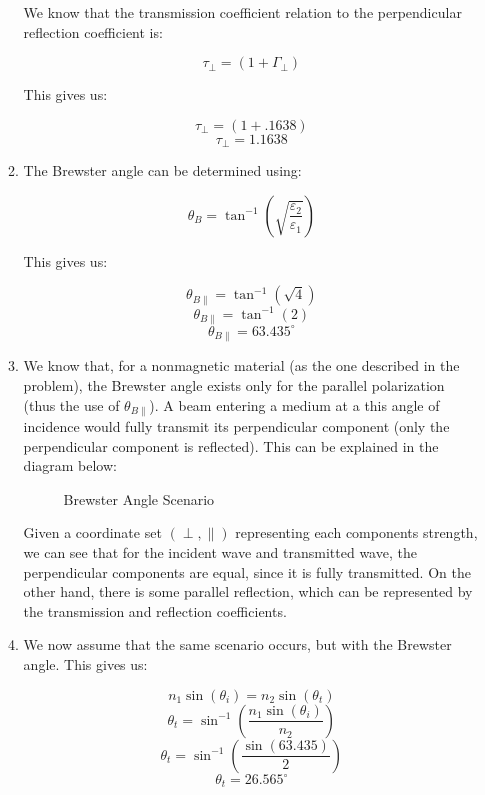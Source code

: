 \begin{enumerate}
\begin{enumerate}
        We know that the transmission coefficient relation to the perpendicular reflection coefficient is:

        $$\tau_{\perp}=(1+\Gamma_{\perp})$$

        This gives us:

        $$\tau_{\perp}=(1+.1638)$$
        $$\boxed{\tau_{\perp}=1.1638}$$

      \item 

        The Brewster angle can be determined using:

        $$\theta_B=\tan^{-1}\left( \sqrt{\frac{\varepsilon_2}{\varepsilon_1}} \right)$$

        This gives us:

        $$\theta_{B\parallel}=\tan^{-1}\left( \sqrt{4} \right)$$
        $$\theta_{B\parallel}=\tan^{-1}\left( 2\right)$$
        $$\boxed{\theta_{B\parallel}=63.435^{\circ}}$$

      \item 

        We know that, for a nonmagnetic material (as the one described in the problem), the Brewster angle exists only for the parallel polarization (thus the use of $\theta_{B\parallel}$). A beam entering a medium at a this angle of incidence would fully transmit its perpendicular component (only the perpendicular component is reflected). This can be explained in the diagram below:

        \begin{figure}[h!]
          \centering
          
          \caption{Brewster Angle Scenario}
          \label{fig:2}
        \end{figure}

        Given a coordinate set $(\perp,\parallel)$ representing each components strength, we can see that for the incident wave and transmitted wave, the perpendicular components are equal, since it is fully transmitted. On the other hand, there is some parallel reflection, which can be represented by the transmission and reflection coefficients.

      \item 

        We now assume that the same scenario occurs, but with the Brewster angle. This gives us:

        $$n_1\sin(\theta_i)=n_2\sin(\theta_t)$$
        $$\theta_t=\sin^{-1}\left(\frac{n_1\sin(\theta_i)}{n_2}\right)$$
        $$\theta_t=\sin^{-1}\left(\frac{\sin(63.435)}{2}\right)$$
        $$\boxed{\theta_t=26.565^{\circ}}$$


\end{enumerate}
\end{enumerate}
